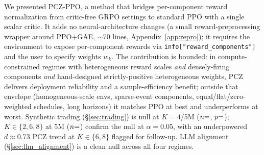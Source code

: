 \documentclass[11pt,a4paper]{article}
\DeclareRobustCommand{\cnum}[1]{\unskip}
\begin{document}
We presented PCZ-PPO, a method that bridges per-component reward normalization from critic-free GRPO settings to standard PPO with a single scalar critic. It adds no neural-architecture changes (a small reward-preprocessing wrapper around PPO+GAE, ${\sim}70$ lines, Appendix~\ref{app:repro}); it requires the environment to expose per-component rewards via \texttt{info["reward\_components"]} and the user to specify weights $w_k$. The contribution is bounded: in compute-constrained regimes with heterogeneous reward scales \emph{and} densely-firing components \emph{and} hand-designed strictly-positive heterogeneous weights, PCZ delivers deployment reliability and a sample-efficiency benefit; outside that envelope (homogeneous-scale envs, sparse-event components, equal/flat/zero-weighted schedules, long horizons) it matches PPO at best and underperforms at worst. Synthetic trading (§\ref{sec:trading}) is null at $K{=}4$/5M ($n{=}\cnum{tv172_n}$, $p{=}\cnum{tv172_welch_p}$); $K{\in}\{2,6,8\}$ at 5M ($n{=}\cnum{tv173_n}$) confirm the null at $\alpha{=}0.05$, with an underpowered $d{\approx}0.73$ PCZ trend at $K{\in}\{6,8\}$ flagged for follow-up. LLM alignment (§\ref{sec:llm_alignment}) is a clean null across all four regimes.
\end{document}
